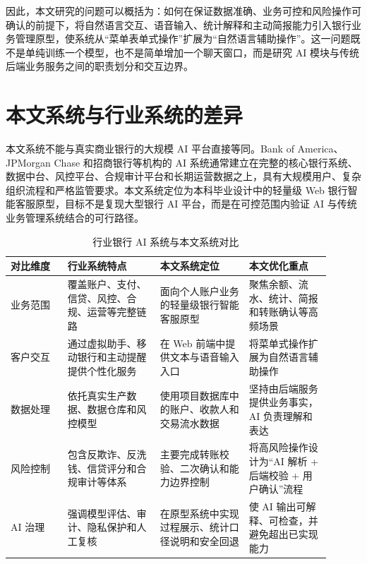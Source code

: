 \documentclass[bachelor, print]{xduthesis}
\begin{document}
因此，本文研究的问题可以概括为：如何在保证数据准确、业务可控和风险操作可确认的前提下，将自然语言交互、语音输入、统计解释和主动简报能力引入银行业务管理原型，使系统从“菜单表单式操作”扩展为“自然语言辅助操作”。这一问题既不是单纯训练一个模型，也不是简单增加一个聊天窗口，而是研究 AI 模块与传统后端业务服务之间的职责划分和交互边界。

\section{本文系统与行业系统的差异}

本文系统不能与真实商业银行的大规模 AI 平台直接等同。Bank of America、JPMorgan Chase 和招商银行等机构的 AI 系统通常建立在完整的核心银行系统、数据中台、风控平台、合规审计平台和长期运营数据之上，具有大规模用户、复杂组织流程和严格监管要求。本文系统定位为本科毕业设计中的轻量级 Web 银行智能客服原型，目标不是复现大型银行 AI 平台，而是在可控范围内验证 AI 与传统业务管理系统结合的可行路径。

\begin{table}[H]
    \centering
    \caption{行业银行 AI 系统与本文系统对比}
    \label{tab:industry-system-compare}
    \begin{tabular}{|p{0.16\linewidth}|p{0.26\linewidth}|p{0.25\linewidth}|p{0.23\linewidth}|}
        \hline
        对比维度 & 行业系统特点 & 本文系统定位 & 本文优化重点 \\
        \hline
        业务范围 & 覆盖账户、支付、信贷、风控、合规、运营等完整链路 & 面向个人账户业务的轻量级银行智能客服原型 & 聚焦余额、流水、统计、简报和转账确认等高频场景 \\
        \hline
        客户交互 & 通过虚拟助手、移动银行和主动提醒提供个性化服务 & 在 Web 前端中提供文本与语音输入入口 & 将菜单式操作扩展为自然语言辅助操作 \\
        \hline
        数据处理 & 依托真实生产数据、数据仓库和风控模型 & 使用项目数据库中的账户、收款人和交易流水数据 & 坚持由后端服务提供业务事实，AI 负责理解和表达 \\
        \hline
        风险控制 & 包含反欺诈、反洗钱、信贷评分和合规审计等体系 & 主要完成转账校验、二次确认和能力边界控制 & 将高风险操作设计为“AI 解析 + 后端校验 + 用户确认”流程 \\
        \hline
        AI 治理 & 强调模型评估、审计、隐私保护和人工复核 & 在原型系统中实现过程展示、统计口径说明和安全回退 & 使 AI 输出可解释、可检查，并避免超出已实现能力 \\
        \hline
    \end{tabular}
\end{table}
\end{document}
